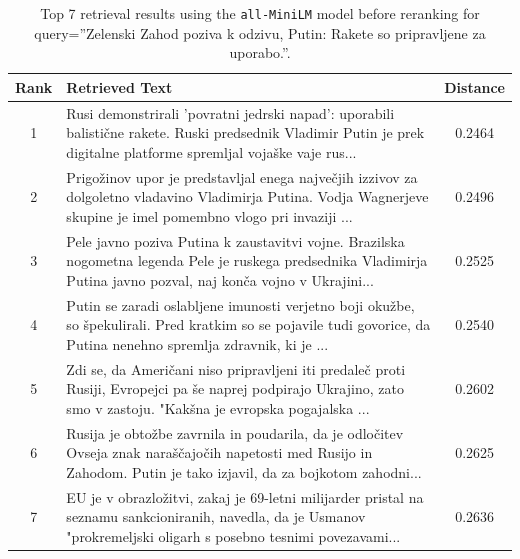 \documentclass[conference]{IEEEtran}
\begin{document}
\begin{table}
\centering
\small
\begin{tabular}{|c|p{13cm}|c|}
\hline
\textbf{Rank} & \textbf{Retrieved Text} & \textbf{Distance} \\
\hline
1 & Rusi demonstrirali 'povratni jedrski napad': uporabili balistične rakete. Ruski predsednik Vladimir Putin je prek digitalne platforme spremljal vojaške vaje rus... & 0.2464 \\
\hline
2 & Prigožinov upor je predstavljal enega največjih izzivov za dolgoletno vladavino Vladimirja Putina. Vodja Wagnerjeve skupine je imel pomembno vlogo pri invaziji ... & 0.2496 \\
\hline
3 & Pele javno poziva Putina k zaustavitvi vojne. Brazilska nogometna legenda Pele je ruskega predsednika Vladimirja Putina javno pozval, naj konča vojno v Ukrajini... & 0.2525 \\
\hline
4 & Putin se zaradi oslabljene imunosti verjetno boji okužbe, so špekulirali. Pred kratkim so se pojavile tudi govorice, da Putina nenehno spremlja zdravnik, ki je ... & 0.2540 \\
\hline
5 & Zdi se, da Američani niso pripravljeni iti predaleč proti Rusiji, Evropejci pa še naprej podpirajo Ukrajino, zato smo v zastoju. "Kakšna je evropska pogajalska ... & 0.2602 \\
\hline
6 & Rusija je obtožbe zavrnila in poudarila, da je odločitev Ovseja znak naraščajočih napetosti med Rusijo in Zahodom. Putin je tako izjavil, da za bojkotom zahodni... & 0.2625 \\
\hline
7 & EU je v obrazložitvi, zakaj je 69-letni milijarder pristal na seznamu sankcioniranih, navedla, da je Usmanov "prokremeljski oligarh s posebno tesnimi povezavami... & 0.2636 \\
\hline
\end{tabular}
\caption{Top 7 retrieval results using the \texttt{all-MiniLM} model before reranking for query=''Zelenski Zahod poziva k odzivu, Putin: Rakete so pripravljene za uporabo.''.}
\label{tab:long_query}
\end{table}
\end{document}
